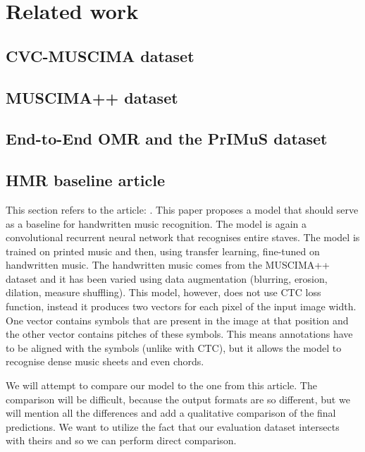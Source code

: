 \chapter*{Related work}

\section*{CVC-MUSCIMA dataset}

\section*{MUSCIMA++ dataset}

\section*{End-to-End OMR and the PrIMuS dataset}

\section*{HMR baseline article}

This section refers to the article: \cite{HmrBaseline}. This paper proposes a model that should serve as a baseline for handwritten music recognition. The model is again a convolutional recurrent neural network that recognises entire staves. The model is trained on printed music and then, using transfer learning, fine-tuned on handwritten music. The handwritten music comes from the MUSCIMA++ dataset and it has been varied using data augmentation (blurring, erosion, dilation, measure shuffling). This model, however, does not use CTC loss function, instead it produces two vectors for each pixel of the input image width. One vector contains symbols that are present in the image at that position and the other vector contains pitches of these symbols. This means annotations have to be aligned with the symbols (unlike with CTC), but it allows the model to recognise dense music sheets and even chords.

We will attempt to compare our model to the one from this article. The comparison will be difficult, because the output formats are so different, but we will mention all the differences and add a qualitative comparison of the final predictions. We want to utilize the fact that our evaluation dataset intersects with theirs and so we can perform direct comparison.
